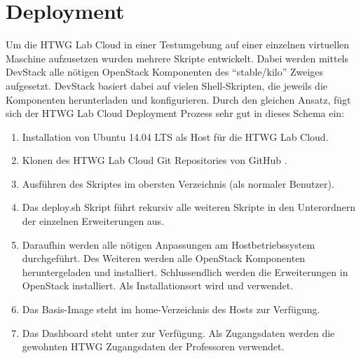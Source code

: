 \chapter{Deployment}

Um die HTWG Lab Cloud in einer Testumgebung auf einer einzelnen virtuellen Maschine aufzusetzen wurden mehrere  Skripte entwickelt.
Dabei werden mittels DevStack \cite{devstack} alle nötigen OpenStack Komponenten des \enquote{stable/kilo} Zweiges aufgesetzt.
DevStack basiert dabei auf vielen Shell-Skripten, die jeweils die Komponenten herunterladen und konfigurieren.
Durch den gleichen Ansatz, fügt sich der HTWG Lab Cloud Deployment Prozess sehr gut in dieses Schema ein:

\begin{enumerate}
\item Installation von Ubuntu 14.04 LTS als Host für die HTWG Lab Cloud.
\item Klonen des HTWG Lab Cloud Git Repositories von GitHub \cite{git-source}.
\item Ausführen des  Skriptes im obersten Verzeichnis (als normaler Benutzer).
\item Das deploy.sh Skript führt rekursiv alle weiteren Skripte in den Unterordnern der einzelnen Erweiterungen aus.
\item Daraufhin werden alle nötigen Anpassungen am Hostbetriebssystem durchgeführt.  Des Weiteren werden alle OpenStack Komponenten heruntergeladen und installiert. Schlussendlich werden die Erweiterungen in OpenStack installiert. Als Installationsort wird  und  verwendet.
\item Das Basis-Image steht im home-Verzeichnis des Hosts zur Verfügung.
\item Das Dashboard steht unter  zur Verfügung. Als Zugangsdaten werden die gewohnten HTWG Zugangsdaten der Professoren verwendet.
\end{enumerate}
